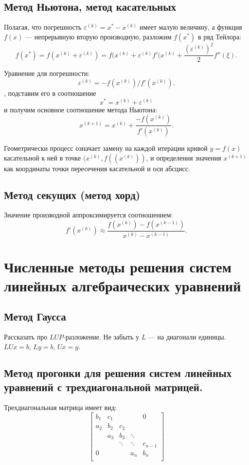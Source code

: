 \documentclass[12pt]{report}
\theoremstyle{definition}
\begin{document}
\subsection{Метод Ньютона, метод касательных}

Полагая, что погрешность $\varepsilon^{(k)} = x^* - x^{(k)}$ имеет малую величину,
а функция $f(x)$ --- непрерывную вторую производную, разложим $f(x^*)$ в ряд
Тейлора:
$$
f(x^*) = f(x^{(k)} + \varepsilon^{(k)}) = f(x^{(k)} + \varepsilon^{(k)}f'(x^{(k)} +
\dfrac{(\varepsilon^{(k)})^2}{2} f''(\xi).
$$

Уравнение для погрешности:
$$
\varepsilon^{(k)} = -f(x^{(k)}) / f'(x^{(k)}).
$$,
подставим его в соотношение
$$
x^* = x^{(k)} + \varepsilon^{(k)}
$$
и получим основное соотношение метода Ньютона:
$$
x^{(k+1)} = x^{(k)} + \dfrac{-f(x^{(k)})}{f'(x^{(k)})}.
$$

Геометрически процесс означает замену на каждой итерации
кривой $y = f(x)$ касательной к ней в точке $(x^{(k)}, f((x^{(k)}))$,
и определения значения $x^{(k+1)}$ как координаты точки пересечения
касательной и оси абсцисс.

\subsection{Метод секущих (метод хорд)}
Значение производной аппроксимируется соотношением:
$$
f'(x^{(k)}) \approx \dfrac{f(x^{(k)}) - f(x^{(k-1)})}{x^{(k)} - x^{(k-1)}}.
$$


\section{Численные методы решения систем линейных алгебраических уравнений}
\subsection{Метод Гаусса}
Рассказать про $LUP$-разложение. Не забыть у $L$ --- на диагонали единицы.
$LUx = b$, $Ly = b$, $Ux = y$.

\subsection
{
  Метод прогонки для решения систем линейных уравнений
  с трехдиагональной матрицей.
}

Трехдиагональная матрица имеет вид:
$$
\begin{bmatrix}
   {b_1} & {c_1} & {   } & {   } & { 0 } \\
   {a_2} & {b_2} & {c_2} & {   } & {   } \\
   {   } & {a_3} & {b_3} & \ddots & {   } \\
   {   } & {   } & \ddots & \ddots & {c_{n-1}}\\
   { 0 } & {   } & {   } & {a_n} & {b_n}\\
\end{bmatrix}
$$
\end{document}
